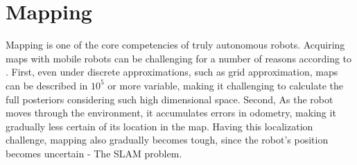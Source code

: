 




\section{Mapping}
Mapping is one of the core competencies of truly autonomous robots\cite{25}. Acquiring maps with mobile robots can be challenging for a number of reasons according to \cite{25}. First, even under discrete approximations, such as grid approximation, maps can be described in $10^5$ or more variable, making it challenging to calculate the full posteriors considering such high dimensional space. Second, As the robot moves through the environment, it accumulates errors in odometry, making it gradually less certain of its location in the map. Having this localization challenge, mapping also gradually becomes tough, since the robot's position becomes uncertain - The SLAM problem.


